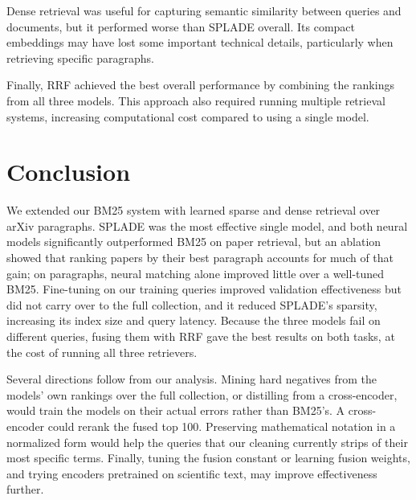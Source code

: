 \documentclass[sigconf,nonacm]{acmart}
\begin{document}
Dense retrieval was useful for capturing semantic similarity between queries
and documents, but it performed worse than SPLADE overall. Its compact
embeddings may have lost some important technical details, particularly 
when retrieving specific paragraphs.

Finally, RRF achieved the best overall performance by combining the rankings 
from all three models. This approach also required running multiple retrieval
systems, increasing computational cost compared to using a single model. 

\section{Conclusion}
We extended our BM25 system with learned sparse and dense retrieval over arXiv 
paragraphs. SPLADE was the most effective single model, and both neural models 
significantly outperformed BM25 on paper retrieval, but an ablation showed that 
ranking papers by their best paragraph accounts for much of that gain; on paragraphs, 
neural matching alone improved little over a well-tuned BM25. Fine-tuning on our 
training queries improved validation effectiveness but did not carry over to the 
full collection, and it reduced SPLADE's sparsity, increasing its index size and 
query latency. Because the three models fail on different queries, fusing them 
with RRF gave the best results on both tasks, at the cost of running all three 
retrievers.

Several directions follow from our analysis. Mining hard negatives from the models' 
own rankings over the full collection, or distilling from a cross-encoder, would 
train the models on their actual errors rather than BM25's. A cross-encoder could 
rerank the fused top 100. Preserving mathematical notation in a normalized form 
would help the queries that our cleaning currently strips of their most specific 
terms. Finally, tuning the fusion constant or learning fusion weights, and trying 
encoders pretrained on scientific text, may improve effectiveness further.



\end{document}
